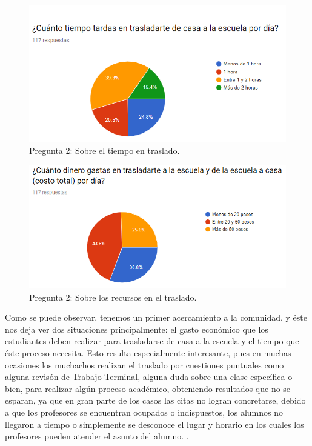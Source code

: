 \begin{figure}[htbp!]
	\centering
	\includegraphics[width=1\textwidth]{intro/images_justificacion/encuesta_horasTraslado}
	\caption{Pregunta 2: Sobre el tiempo en traslado.}
\end{figure}

\pagebreak
\begin{figure}[htbp!]
	\centering
	\includegraphics[width=1\textwidth]{intro/images_justificacion/encuesta_dineroTraslado}
	\caption{Pregunta 2: Sobre los recursos en el traslado.}
\end{figure}

\noindent
\newline
Como se puede observar, tenemos un primer acercamiento a la comunidad, y éste nos deja ver dos situaciones
principalmente: el gasto económico que los estudiantes deben realizar para trasladarse de casa a la escuela
y el tiempo que éste proceso necesita. Esto resulta especialmente interesante, pues en muchas ocasiones
los muchachos realizan el traslado por cuestiones puntuales como alguna revisón de Trabajo Terminal, alguna
duda sobre una clase específica o bien, para realizar algún proceso académico, obteniendo resultados que
no se esparan, ya que en gran parte de los casos las citas no logran concretarse, debido a que los profesores
se encuentran ocupados o indispuestos, los alumnos no llegaron a tiempo o simplemente se desconoce el lugar y
horario en los cuales los profesores pueden atender el asunto del alumno. \cite{encuesta}. 

